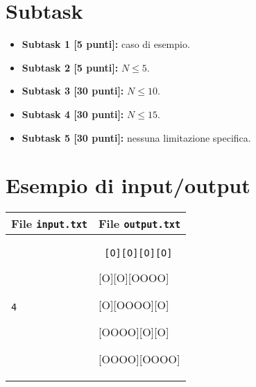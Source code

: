 \documentclass[a4paper,11pt]{article}
\newcommand{\file}[1]{\texttt{#1}}
\newcommand{\esempio}[2]{
\noindent\begin{minipage}{\textwidth}
\begin{tabular}{|p{11cm}|p{5cm}|}
	\hline
	\textbf{File \file{input.txt}} & \textbf{File \file{output.txt}}\\
	\hline
	\tt \small #1 &
	\tt \small #2 \\
	\hline
\end{tabular}
\end{minipage}
}
\begin{document}
\section*{Subtask}
\begin{itemize}
\item \textbf{Subtask 1 [\phantom{1}5 punti]:} caso di esempio.
\item \textbf{Subtask 2 [\phantom{1}5 punti]:} $N \le 5$.
\item \textbf{Subtask 3 [30 punti]:} $N \le 10$.
\item \textbf{Subtask 4 [30 punti]:} $N \le 15$.
\item \textbf{Subtask 5 [30 punti]:} nessuna limitazione specifica.
\end{itemize}

\section*{Esempio di input/output}
\esempio{4}{
[O][O][O][O]

[O][O][OOOO]

[O][OOOO][O]

[OOOO][O][O]

[OOOO][OOOO]
}
\end{document}
